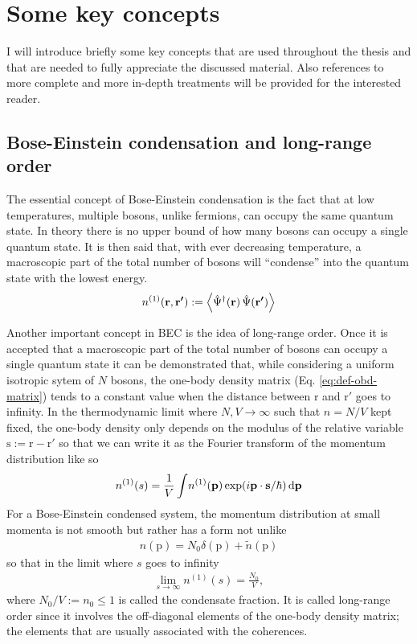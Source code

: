 \documentclass[11pt,a4paper,twoside]{article}
\renewcommand{\vec}[1]{\bm{\mathrm{#1}}}
\begin{document}
	\section{Some key concepts}
	I will introduce briefly some key concepts that are used throughout the thesis and that are needed to fully appreciate the discussed material. Also references to more complete and more in-depth treatments will be provided for the interested reader.
		
		\subsection{Bose-Einstein condensation and long-range order}
			The essential concept of Bose-Einstein condensation is the fact that at low temperatures, multiple bosons, unlike fermions, can occupy the same quantum state. In theory there is no upper bound of how many bosons can occupy a single quantum state. It is then said that, with ever decreasing temperature, a macroscopic part of the total number of bosons will ``condense'' into the quantum state with the lowest energy.\\
			
			\begin{align}
				n^{(1)}(\vec{r},\vec{r'}) := \expectationvalue{\hat{\Psi}^\dagger(\vec{r})\,\hat{\Psi}(\vec{r'})}\label{eq:def-obd-matrix}
			\end{align}
			
			Another important concept in BEC is the idea of long-range order. Once it is accepted that a macroscopic part of the total number of bosons can occupy a single quantum state it can be demonstrated that, while considering a uniform isotropic sytem of $N$ bosons, the one-body density matrix (Eq. \ref{eq:def-obd-matrix}) tends to a constant value when the distance between $\vec{r}$ and $\vec{r}'$ goes to infinity. In the thermodynamic limit where $N,V\rightarrow\infty$ such that $n=N/V$ kept fixed, the one-body density only depends on the modulus of the relative variable $\vec{s}:=\vec{r}-\vec{r}'$ so that we can write it as the Fourier transform of the momentum distribution like so
			\begin{align}
				n^{(1)}(s) = \frac{1}{V}\int \! n^{(1)}\qty(\vec{p})\exp(i\vec{p}\cdot\vec{s}/\hbar)\,\mathrm{d}\vec{p}
			\end{align}
			For a Bose-Einstein condensed system, the momentum distribution at small momenta is not smooth but rather has a form not unlike
			\begin{align}
				n(\vec{p})=N_0\delta(\vec{p})+\tilde{n}(\vec{p})
			\end{align}
			so that in the limit where $s$ goes to infinity
			\begin{align}
				\lim_{s\rightarrow\infty}n^{(1)}(s)=\frac{N_0}{V},
			\end{align}
			where $N_0/V:=n_0\leq 1$ is called the condensate fraction. It is called long-range order since it involves the off-diagonal elements of the one-body density matrix; the elements that are usually associated with the coherences.\\
			
\end{document}
